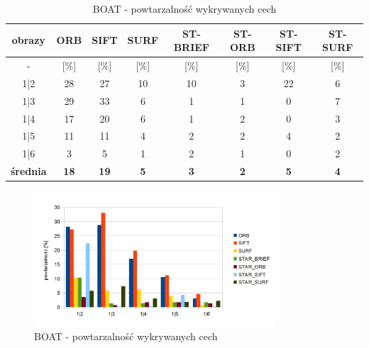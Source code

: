 \begin{table}[htbp]
  \centering
  \caption{BOAT - powtarzalność wykrywanych cech}
    \begin{tabular}{|c|c|c|c|c|c|c|c|}\hline

    obrazy & \textbf{ORB} & \textbf{SIFT} & \textbf{SURF} & \textbf{ST-BRIEF} & \textbf{ST-ORB} & \textbf{ST-SIFT} & \textbf{ST-SURF} \\\hline

   - & [\%] & [\%] & [\%] & [\%] & [\%] & [\%] & [\%] \\
    1|2 & 28 & 27 & 10 & 10 & 3 & 22 & 6 \\
    1|3 & 29 & 33 & 6 & 1 & 1 & 0 & 7 \\
    1|4 & 17 & 20 & 6 & 1 & 2 & 0 & 3 \\
    1|5 & 11 & 11 & 4 & 2 & 2 & 4 & 2 \\
    1|6 & 3 & 5 & 1 & 2 & 1 & 0 & 2 \\\hline
    \textbf{średnia} & \textbf{18} & \textbf{19} & \textbf{5} & \textbf{3} & \textbf{2} & \textbf{5} & \textbf{4} \\\hline
   
    \end{tabular}%
  \label{tab:boat_m1}%
\end{table}%


\begin{figure}
\centering
\includegraphics[width=0.8\textwidth]{pict/mikolajczyk/boat/m1.png}
\caption{BOAT - powtarzalność wykrywanych cech}
\label{fig:boat_m1}
\end{figure}

